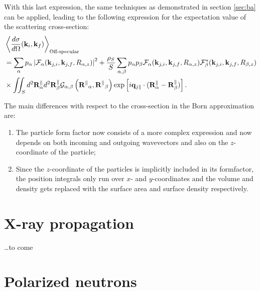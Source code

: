 With this last expression, the same techniques as demonstrated in section \ref{sec:ba} can be applied, leading to the following expression for the expectation value of the scattering cross-section:
\begin{align*}
  & \left\langle \frac{d\sigma}{d\Omega}(\mathbf{k}_i,\mathbf{k}_f) \right\rangle_{\text{Off-specular}}  \\
  & = \sum_\alpha p_\alpha \left\lvert \mathcal{F}_\alpha(\mathbf{k}_{j,i},\mathbf{k}_{j,f}, R_{\alpha,z})\right\rvert ^2 + \frac{\rho_S}{S}\sum_{\alpha,\beta} p_\alpha p_\beta \mathcal{F}_\alpha (\mathbf{k}_{j,i},\mathbf{k}_{j,f}, R_{\alpha,z})\mathcal{F}_\beta^*(\mathbf{k}_{j,i},\mathbf{k}_{j,f}, R_{\beta,z}) \\
  & \times \iint_S d^2\mathbf{R}_\alpha^\parallel d^2\mathbf{R}_\beta^\parallel \mathcal{G}_{\alpha ,\beta}\left( \mathbf{R^\parallel}_{\alpha} , \mathbf{R^\parallel}_{\beta} \right) \exp \left[ i\mathbf{q}_{j\parallel}\cdot (\mathbf{R}_\alpha^\parallel - \mathbf{R}_\beta^\parallel ) \right].
\end{align*}

The main differences with respect to the cross-section in the Born approximation are:
\begin{enumerate}
  \item The particle form factor now consists of a more complex expression and now depends on both incoming and outgoing wavevectors and also on the $z$-coordinate of the particle;
  \item Since the $z$-coordinate of the particles is implicitly included in its formfactor, the position integrals only run over $x$- and $y$-coordinates and the volume and density gets replaced with the surface area and surface density respectively.
\end{enumerate}

\section{X-ray propagation}\label{Sxray}

\ldots to come


\section{Polarized neutrons}\label{Snpol}



